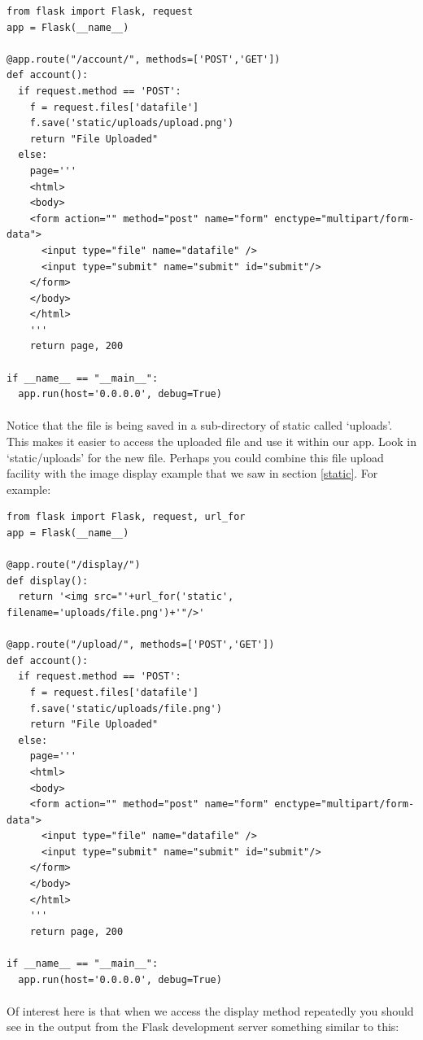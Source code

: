 \documentclass[12pt, a4paper, oneside]{book}
\begin{document}
\begin{lstlisting}
from flask import Flask, request
app = Flask(__name__)

@app.route("/account/", methods=['POST','GET'])
def account():
  if request.method == 'POST':
    f = request.files['datafile']
    f.save('static/uploads/upload.png')
    return "File Uploaded"
  else:
    page='''
    <html>
    <body>
    <form action="" method="post" name="form" enctype="multipart/form-data">
      <input type="file" name="datafile" />
      <input type="submit" name="submit" id="submit"/>
    </form>
    </body>
    </html>
    '''
    return page, 200

if __name__ == "__main__":
  app.run(host='0.0.0.0', debug=True)
\end{lstlisting}

\paragraph{} Notice that the file is being saved in a sub-directory of static called `uploads'. This makes it easier to access the uploaded file and use it within our app. Look in `static/uploads' for the new file. Perhaps you could combine this file upload facility with the image display example that we saw in section \ref{static}. For example:

\begin{lstlisting}
from flask import Flask, request, url_for
app = Flask(__name__)

@app.route("/display/")
def display():
  return '<img src="'+url_for('static', filename='uploads/file.png')+'"/>'

@app.route("/upload/", methods=['POST','GET'])
def account():
  if request.method == 'POST':
    f = request.files['datafile']
    f.save('static/uploads/file.png')
    return "File Uploaded"
  else:
    page='''
    <html>
    <body>
    <form action="" method="post" name="form" enctype="multipart/form-data">
      <input type="file" name="datafile" />
      <input type="submit" name="submit" id="submit"/>
    </form>
    </body>
    </html>
    '''
    return page, 200

if __name__ == "__main__":
  app.run(host='0.0.0.0', debug=True)
\end{lstlisting}

\paragraph{} Of interest here is that when we access the display method repeatedly you should see in the output from the Flask development server something similar to this:
\end{document}
